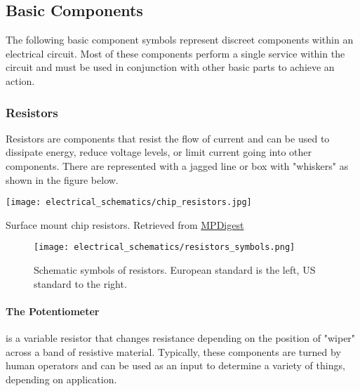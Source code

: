 

    \subsection{Basic Components} 
    The following basic component symbols represent discreet components within an electrical circuit.
    Most of these components perform a single service within the circuit and must be used in conjunction with other basic parts to achieve an action.

        \subsubsection*{Resistors} 
        Resistors are components that resist the flow of current and can be used to dissipate energy, reduce voltage levels, or limit current going into other components.
        There are represented with a jagged line or box with "whiskers" as shown in the figure below.

        \begin{marginfigure}[-2in]
            \texttt{[image: electrical\_schematics/chip\_resistors.jpg]}
            \caption[Chip Resistors]{Surface mount chip resistors. 
            Retrieved from \href{https://www.mpdigest.com/2018/01/24/thick-film-chip-resistors/}{MPDigest}}
        \end{marginfigure}

        \begin{figure}[h!]
            \texttt{[image: electrical\_schematics/resistors\_symbols.png]}
            \caption[Resistor Symbols]{Schematic symbols of resistors. 
            European standard is the left, US standard to the right.}
        \end{figure}

        \paragraph*{The Potentiometer} is a variable resistor that changes resistance depending on the position of "wiper" across a band of resistive material.
        Typically, these components are turned by human operators and can be used as an input to determine a variety of things, depending on application.

